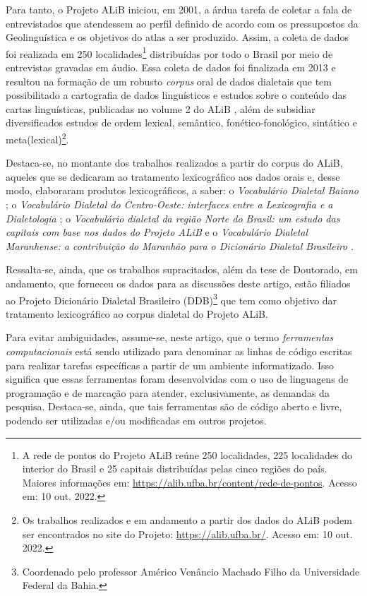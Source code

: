 \documentclass[portuguese]{textolivre}
\begin{document}
Para tanto, o Projeto ALiB iniciou, em 2001, a árdua tarefa de coletar a fala de entrevistados que atendessem ao perfil definido de acordo com os pressupostos da Geolinguística e os objetivos do atlas a ser produzido. Assim, a coleta de dados foi realizada em 250 localidades\footnote{A rede de pontos do Projeto ALiB reúne 250 localidades, 225 localidades do interior do Brasil e 25 capitais distribuídas pelas cinco regiões do país. Maiores informações em: \url{https://alib.ufba.br/content/rede-de-pontos}. Acesso em: 10 out. 2022.} distribuídas por todo o Brasil por meio de entrevistas gravadas em áudio. Essa coleta de dados foi finalizada em 2013 e resultou na formação de um robusto \emph{corpus} oral de dados dialetais que tem possibilitado a cartografia de dados linguísticos e estudos sobre o conteúdo das cartas linguísticas, publicadas no volume 2 do ALiB \cite{cardoso2014atlas}, além de subsidiar diversificados estudos de ordem lexical, semântico, fonético-fonológico, sintático e meta(lexical)\footnote{Os trabalhos realizados e em andamento a partir dos dados do ALiB podem ser encontrados no site do Projeto: \url{https://alib.ufba.br/}. Acesso em: 10 out. 2022.}. 

Destaca-se, no montante dos trabalhos realizados a partir do corpus do ALiB, aqueles que se dedicaram ao tratamento lexicográfico aos dados orais e, desse modo, elaboraram produtos lexicográficos, a saber: o \emph{Vocabulário Dialetal Baiano} \cite{neiva2017}; o \emph{Vocabulário Dialetal do Centro-Oeste: interfaces entre a Lexicografia e a Dialetologia} \cite{costa2018};  o \emph{Vocabulário dialetal da região Norte do Brasil: um estudo das capitais com base nos dados do Projeto ALiB} \cite{correasousa2019vocabulario} e o \emph{Vocabulário Dialetal Maranhense: a contribuição do Maranhão para o Dicionário Dialetal Brasileiro} \cite{maramaldo2019}.

Ressalta-se, ainda, que os trabalhos supracitados, além da tese de Doutorado, em andamento, que forneceu os dados para as discussões deste artigo, estão filiados ao Projeto Dicionário Dialetal Brasileiro (DDB)\footnote{Coordenado pelo professor Américo Venâncio Machado Filho da Universidade Federal da Bahia.} \cite{machado2010ponto} que tem como objetivo dar tratamento lexicográfico ao corpus dialetal do Projeto ALiB.

Para evitar ambiguidades, assume-se, neste artigo, que o termo \emph{ferramentas computacionais} está sendo utilizado para denominar as linhas de código escritas para realizar tarefas específicas a partir de um ambiente informatizado. Isso significa que essas ferramentas foram desenvolvidas com o uso de linguagens de programação e de marcação para atender, exclusivamente, as demandas da pesquisa. Destaca-se, ainda, que tais ferramentas são de código aberto e livre, podendo ser utilizadas e/ou modificadas em outros projetos.
\end{document}
